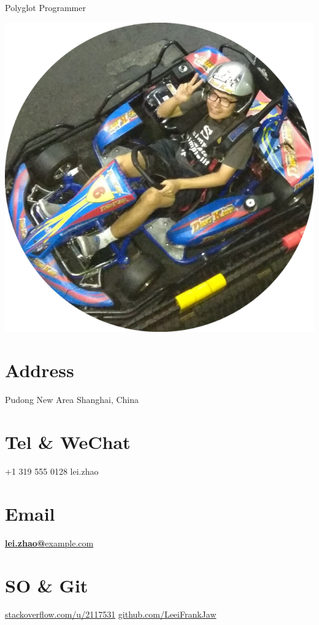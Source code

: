\documentclass[a4paper]{friggeri-cv}
\begin{document}
      {Polyglot Programmer}
      

\begin{aside}
  \includegraphics[scale=0.18]{img/zhao_circle.png}
  \section{Address}
  Pudong New Area
  Shanghai, China
  ~
  \section{Tel \& WeChat}
  +1 319 555 0128
  lei.zhao
  ~
  \section{Email}
  \href{mailto:lei.zhao@example.com}{\textbf{lei.zhao@}example.com}
  ~
  \section{SO \& Git}
  \href{https://stackoverflow.com/users/2117531/lei-zhao}{stackoverflow.com/u/2117531}
  \href{https://github.com/LeeiFrankJaw}{github.com/LeeiFrankJaw}
  ~

\end{aside}
\end{document}
